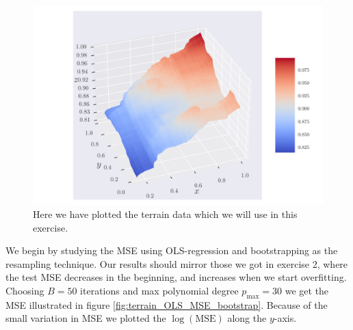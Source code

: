 \documentclass[reprint,english,notitlepage,aps,nobalancelastpage,nofootinbib]{revtex4-1}  %
\begin{document}
\begin{figure}[H]
  \includegraphics[width=\linewidth]{SRTM_rawdata_n50.pdf}
  \caption{Here we have plotted the terrain data which we will use in this exercise.}
  \label{fig:terrain_raw}
\end{figure}

We begin by studying the MSE using OLS-regression and bootstrapping as the resampling technique. Our results should mirror those we got in exercise 2, where the test MSE decreases in the beginning, and increases when we start overfitting. Choosing $B = 50$ iterations and max polynomial degree $p_\text{max} = 30$ we get the MSE illustrated in figure \ref{fig:terrain_OLS_MSE_bootstrap}. Because of the small variation in MSE we plotted the $\log(\text{MSE})$ along the $y$-axis.
\end{document}
